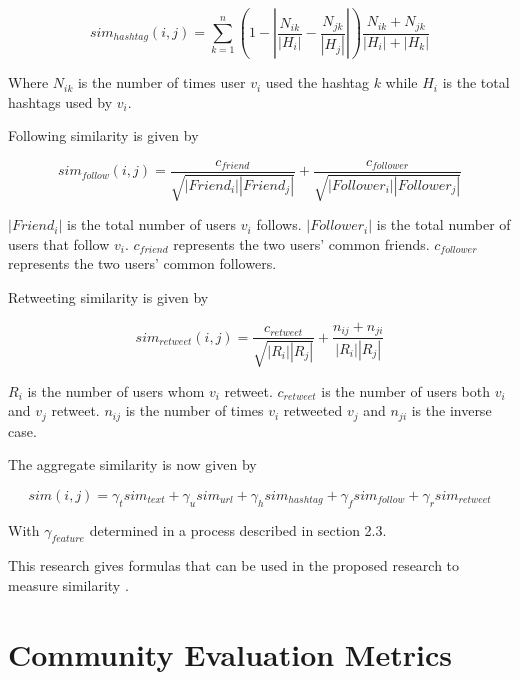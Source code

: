 \begin{equation}
sim_{hashtag}(i,j) = \sum_{k=1}^n (1 - \left|{\frac{N_{ik}}{\left|{H_i}\right|} - \frac{N_{jk}}{\left|{H_j}\right|}}\right|)\frac{N_{ik} + N_{jk}}{\left|{H_i}\right| + \left|{H_k}\right|}
\end{equation}

Where $N_{ik}$ is the number of times user $v_i$ used the hashtag $k$ while $H_i$ is the total hashtags used by $v_i$.

Following similarity is given by 

\begin{equation}
sim_{follow}(i,j) = \frac{c_{friend}}{\sqrt{\left|{Friend_i}\right|\left|{Friend_j}\right|}} + \frac{c_{follower}}{\sqrt{\left|{Follower_i}\right|\left|{Follower_j}\right|}}
\end{equation}

$\left|{Friend_i}\right|$ is the total number of users $v_i$ follows. $\left|{Follower_i}\right|$ is the total number of users that follow $v_i$. $c_{friend}$ represents the two users’ common friends. $c_{follower}$ represents the two users’ common followers.

Retweeting similarity is given by 

\begin{equation}
sim_{retweet}(i,j) = \frac{c_{retweet}}{\sqrt{\left|{R_i}\right|\left|{R_j}\right|}} + \frac{n_{ij} + n_{ji}}{\left|{R_i}\right|\left|{R_j}\right|}
\end{equation}

$R_i$ is the number of users whom $v_i$ retweet. $c_{retweet}$ is the number of users both $v_i$ and $v_j$ retweet. $n_{ij}$ is the number of times $v_i$ retweeted $v_j$ and $n_{ji}$ is the inverse case. 

The aggregate similarity is now given by

\begin{equation}
sim(i,j) = \gamma_t sim_{text} + \gamma_u sim_{url} + \gamma_h sim_{hashtag} + \gamma_f sim_{follow} + \gamma_r sim_{retweet}
\end{equation}

With $\gamma_{feature}$ determined in a process described in section 2.3.

This research gives formulas that can be used in the proposed research to measure similarity \cite{Zhang:2012}. 

\section{Community Evaluation Metrics}

